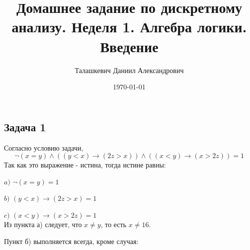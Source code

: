 \documentclass[a4paper,12pt]{article} %
\author{Талашкевич Даниил Александрович}
\title{Домашнее задание по дискретному анализу. Неделя 1. Алгебра логики. Введение}
\date{\today}
\begin{document}
\maketitle

\newpage
\begin{center}
\section*{Задача 1}
\end{center}

Согласно условию задачи,
\[ \neg{(x=y)} \land((y<x) \to (2z>x)) \land((x<y) \to (x>2z)) =1\]
Так как это выражение - истина, тогда истине равны:

$a)$ $\neg{(x=y)}=1$ 

$b)$ $(y<x) \to (2z>x)=1$

$c)$ $(x<y) \to (x>2z)=1$ \\

Из пункта а) следует, что $x \neq y$, то есть $x \neq 16$.

Пункт б) выполняется всегда, кроме случая:
\end{document}

